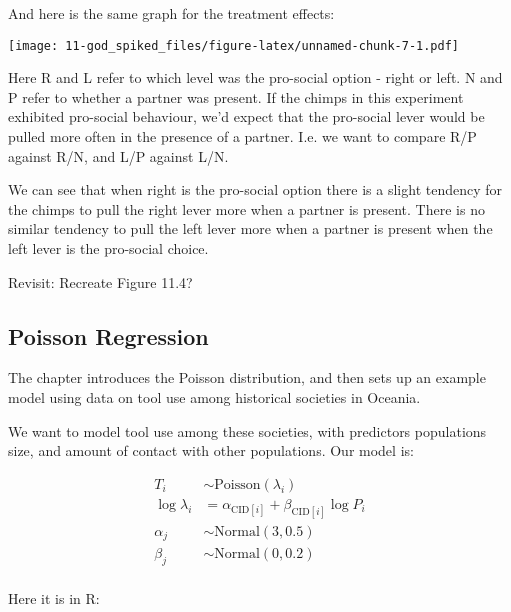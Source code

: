 \documentclass[
]{book}
\begin{document}
And here is the same graph for the treatment effects:

\texttt{[image: 11-god\_spiked\_files/figure-latex/unnamed-chunk-7-1.pdf]}

Here R and L refer to which level was the pro-social option - right or left. N and P refer to whether a partner was present. If the chimps in this experiment exhibited pro-social behaviour, we'd expect that the pro-social lever would be pulled more often in the presence of a partner. I.e. we want to compare R/P against R/N, and L/P against L/N.

We can see that when right is the pro-social option there is a slight tendency for the chimps to pull the right lever more when a partner is present. There is no similar tendency to pull the left lever more when a partner is present when the left lever is the pro-social choice.

Revisit: Recreate Figure 11.4?

\hypertarget{poisson-regression}{%
\subsection{Poisson Regression}\label{poisson-regression}}

The chapter introduces the Poisson distribution, and then sets up an example model using data on tool use among historical societies in Oceania.

We want to model tool use among these societies, with predictors populations size, and amount of contact with other populations. Our model is:

\[
\begin{aligned}
T_i &\sim \text{Poisson}(\lambda_i) \\
\log \lambda_i &= \alpha_{\text{CID}[i]}+ \beta_{\text{CID}[i]} \log P_i \\
\alpha_j &\sim \text{Normal}(3,0.5) \\
\beta_j &\sim \text{Normal}(0,0.2)\\
\end{aligned}
\]

Here it is in R:
\end{document}
